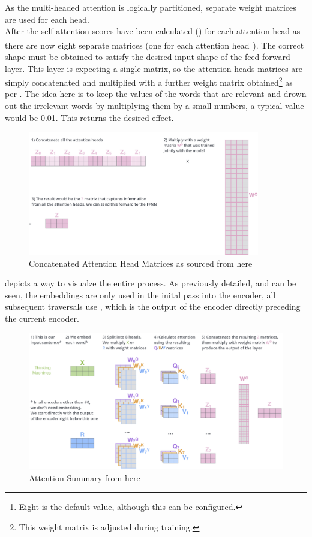 

As the multi-headed attention is logically partitioned, separate weight matrices are used for each head. \\
After the self attention scores have been calculated () for each attention head as there are now
eight separate matrices (one for each attention head\footnote{Eight is the default value, although this can be configured.}). The correct shape
must be obtained to satisfy the desired input shape of the feed forward layer. This layer is expecting a single matrix, so the attention heads
matrices are simply concatenated and multiplied with a further weight matrix obtained\footnote{This weight matrix is adjusted during training.} as per
. The idea here is to keep the values of the words that are relevant and drown out the irrelevant words by multiplying
them by a small numbers, a typical value would be 0.01. This returns the desired effect.
\begin{figure}[H]
	\centering
	\includegraphics[width=0.9\textwidth]{figures/concat_atn_head_matrices.png}
	\caption{Concatenated Attention Head Matrices as sourced from here~\autocite{alammarIllustratedTransformer}}
	\label{fig:concat_atn_head_matrices}
\end{figure}
 depicts a way to visualze the entire process. As previously detailed, and can be seen, the embeddings are only
used in the inital pass into the encoder, all subsequent traversals use , which is the output of the encoder directly preceding the
current encoder.
\begin{figure}[H]
	\centering
	\includegraphics[width=1\textwidth]{figures/atn_summary.png}
	\caption{Attention Summary from here~\autocite{alammarIllustratedTransformer}}
	\label{fig:atn_summary}
\end{figure}
